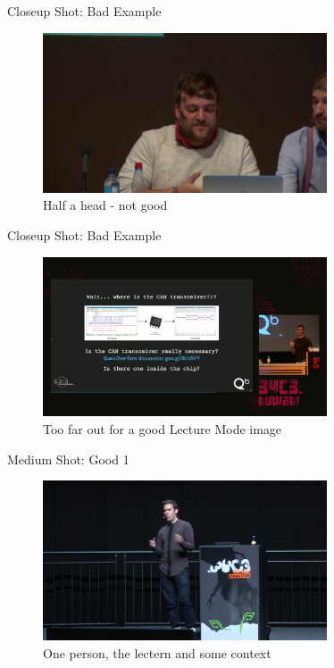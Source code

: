 \begin{frame}{Closeup Shot: Bad Example}
	\begin{figure}
		\centering
		\includegraphics[width=0.75\textwidth]{images/shot-closeup-bad1.png}
		\caption{Half a head - not good}
	\end{figure}
\end{frame}

\begin{frame}{Closeup Shot: Bad Example}
	\begin{figure}
		\centering
		\includegraphics[width=0.75\textwidth]{images/shot-closeup-bad2.png}
		\caption{Too far out for a good Lecture Mode image}
	\end{figure}
\end{frame}

\begin{frame}{Medium Shot: Good 1}
	\begin{figure}
		\centering
		\includegraphics[width=0.75\textwidth]{images/shot-medium1.png}
		\caption{One person, the lectern and some context}
	\end{figure}
\end{frame}

